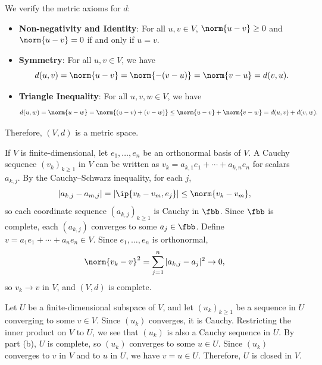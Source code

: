 \begin{solenum}
    \item We verify the metric axioms for $d$:
    \begin{itemize}
        \item \textbf{Non-negativity and Identity}: For all $u, v \in V$, $\norm{u - v} \geq 0$ and $\norm{u - v} = 0$ if and only if $u = v$.
        \item \textbf{Symmetry}: For all $u, v \in V$, we have
        \[
            d(u, v) = \norm{u - v} = \norm{-(v - u)} = \norm{v - u} = d(v, u).
        \]
        \item \textbf{Triangle Inequality}: For all $u, v, w \in V$, we have
        \[
            d(u, w) = \norm{u - w} = \norm{(u - v) + (v - w)} \leq \norm{u - v} + \norm{v - w} = d(u, v) + d(v, w).
        \]
    \end{itemize}
    Therefore, $(V, d)$ is a metric space.
    \item If $V$ is finite-dimensional, let $e_1, \ldots, e_n$ be an orthonormal basis of $V$.
    A Cauchy sequence $(v_k)_{k \geq 1}$ in $V$ can be written as $v_k = a_{k,1} e_1 + \cdots + a_{k,n} e_n$ for scalars $a_{k,j}$.
    By the Cauchy--Schwarz inequality, for each $j$,
    \[
        |a_{k,j} - a_{m,j}| = |\ip{v_k - v_m, e_j}| \leq \norm{v_k - v_m},
    \]
    so each coordinate sequence $(a_{k,j})_{k \geq 1}$ is Cauchy in $\fbb$.
    Since $\fbb$ is complete, each $(a_{k,j})$ converges to some $a_j \in \fbb$.
    Define $v = a_1 e_1 + \cdots + a_n e_n \in V$.
    Since $e_1, \ldots, e_n$ is orthonormal,
    \[
        \norm{v_k - v}^2 = \sum_{j=1}^{n} |a_{k,j} - a_j|^2 \to 0,
    \]
    so $v_k \to v$ in $V$, and $(V, d)$ is complete.
    \item Let $U$ be a finite-dimensional subspace of $V$, and let $(u_k)_{k \geq 1}$ be a sequence in $U$ converging to some $v \in V$.
    Since $(u_k)$ converges, it is Cauchy.
    Restricting the inner product on $V$ to $U$, we see that $(u_k)$ is also a Cauchy sequence in $U$.
    By part (b), $U$ is complete, so $(u_k)$ converges to some $u \in U$.
    Since $(u_k)$ converges to $v$ in $V$ and to $u$ in $U$, we have $v = u \in U$.
    Therefore, $U$ is closed in $V$.
\end{solenum}